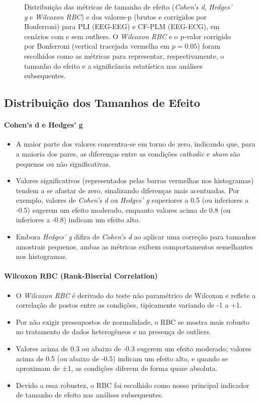 \begin{figure}[htb]
{    }
    \caption[Distribuições de tamanhos de efeito e valores-p]{Distribuição das métricas de tamanho de efeito (\emph{Cohen's d}, \emph{Hedges' g} e \emph{Wilcoxon RBC}) e dos valores-p (brutos e corrigidos por Bonferroni) para PLI (EEG-EEG) e CF-PLM (EEG-ECG), em cenários com e sem outliers. O \emph{Wilcoxon RBC} e o p-valor corrigido por Bonferroni (vertical tracejada vermelha em $p=0.05$) foram escolhidos como as métricas para representar, respectivamente, o tamanho do efeito e a significância estatística nas análises subsequentes.}
    \label{fig:effectsizehist_all}    
\end{figure}
\subsection{Distribuição dos Tamanhos de Efeito}

\paragraph{Cohen's d e Hedges' g}
\begin{itemize}
    \item A maior parte dos valores concentra-se em torno de zero, indicando que, para a maioria dos pares, as diferenças entre as condições \emph{cathodic} e \emph{sham} são pequenas ou não significativas.
    \item Valores significativos (representados pelas barras vermelhas nos histogramas) tendem a se afastar de zero, sinalizando diferenças mais acentuadas. Por exemplo, valores de \emph{Cohen's d} ou \emph{Hedges' g} superiores a 0.5 (ou inferiores a -0.5) sugerem um efeito moderado, enquanto valores acima de 0.8 (ou inferiores a -0.8) indicam um efeito alto.
    \item Embora \emph{Hedges' g} difira de \emph{Cohen's d} ao aplicar uma correção para tamanhos amostrais pequenos, ambas as métricas exibem comportamentos semelhantes nos histogramas.
\end{itemize}

\paragraph{Wilcoxon RBC (Rank-Biserial Correlation)}
\begin{itemize}
    \item O \emph{Wilcoxon RBC} é derivado do teste não paramétrico de Wilcoxon e reflete a correlação de postos entre as condições, tipicamente variando de -1 a +1.
    \item Por não exigir pressupostos de normalidade, o RBC se mostra mais robusto no tratamento de dados heterogêneos e na presença de outliers.
    \item Valores acima de 0.3 ou abaixo de -0.3 sugerem um efeito moderado; valores acima de 0.5 (ou abaixo de -0.5) indicam um efeito alto, e quando se aproximam de ±1, as condições diferem de forma quase absoluta.
    \item Devido a essa robustez, o RBC foi escolhido como nosso principal indicador de tamanho de efeito nas análises subsequentes.
\end{itemize}

